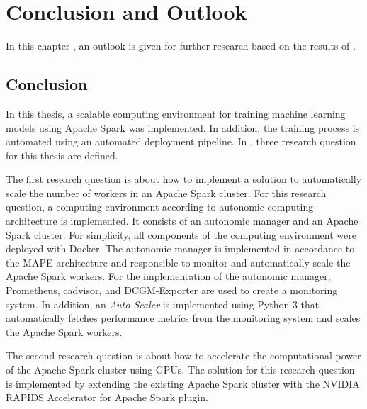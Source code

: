 \chapter{Conclusion and Outlook}
\label{chap:08_outlook}

In this chapter , an outlook is given for further research based on the results of .


\section{Conclusion}
In this thesis, a scalable computing environment for training machine learning models using Apache Spark was implemented. In addition, the training process is automated using an automated deployment pipeline.
In , three research question for this thesis are defined.


The first research question is about how to implement a solution to automatically scale the number of workers in an Apache Spark cluster.
For this research question, a computing environment according to autonomic computing architecture  is implemented.
It consists of an autonomic manager and an Apache Spark cluster.
For simplicity, all components of the computing environment were deployed with Docker.
The autonomic manager is implemented in accordance to the MAPE architecture and responsible to monitor and automatically scale the Apache Spark workers.
For the implementation of the autonomic manager, Prometheus, cadvisor, and DCGM-Exporter are used to create a monitoring system.
In addition, an \textit{Auto-Scaler} is implemented using Python 3 that automatically fetches performance metrics from the monitoring system and scales the Apache Spark workers.


The second research question is about how to accelerate the computational power of the Apache Spark cluster using GPUs.
The solution for this research question is implemented by extending the existing Apache Spark cluster with the NVIDIA RAPIDS Accelerator for Apache Spark plugin.
%


